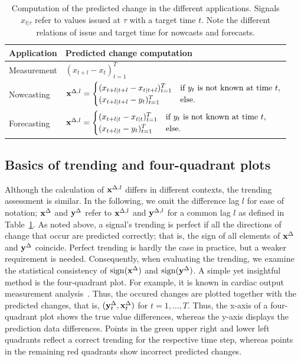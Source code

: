 \begin{table}
    \centering
    \begin{tabularx}{0.75\textwidth}{l X}
        \toprule
        Application & Predicted change computation \\
        \midrule
        Measurement & $(x_{t + l} - x_t)_{t=1}^T \label{eq:diffxl_measure} $\\
        Nowcasting & $
\mathbf{x}^{\Delta,l} =
\begin{cases}
(x_{t+l|t+l} -x_{t|t+l})^T_{t=1} & \text{if } y_{t} \text{ is not known at time } t, \\
(x_{t+l|t+l} -y_{t})^T_{t=1} & \text{else}.
\end{cases} \label{eq:diffxl_nowcasting}
$ \\
        Forecasting & $
\mathbf{x}^{\Delta,l} =
\begin{cases}
(x_{t+l|t} - x_{t|t})^T_{t=1} & \text{if } y_{t} \text{ is not known at time } t, \\
(x_{t+l|t} - y_{t})^T_{t=1}  & \text{else}.
\end{cases} \label{eq:diffxl_forecasting}
$\\
        \bottomrule
    \end{tabularx}
    \caption{Computation of the predicted change in the different applications. Signals $x_{t | \tau}$ refer to values issued at $\tau$ with a target time $t$. Note the different relations of issue and target time for nowcasts and forecasts. }
    \label{tab:notation}
\end{table}


\subsection{Basics of trending and four-quadrant plots}\label{subsec:trending-basics}

Although the calculation of $\mathbf{x}^{\Delta,l}$ differs in different contexts, the trending assessment is similar.
In the following, we omit the difference lag $l$ for ease of notation; $\mathbf{x}^{\Delta}$ and $\mathbf{y}^{\Delta}$ refer to $\mathbf{x}^{\Delta,l}$ and $\mathbf{y}^{\Delta,l}$ for a common lag $l$ as defined in Table~\ref{tab:notation}.
As noted above, a signal's trending is perfect if all the directions of change that occur are predicted correctly; that is, the sign of all elements of $\mathbf{x}^{\Delta}$ and $\mathbf{y}^{\Delta}$ coincide.
Perfect trending is hardly the case in practice, but a weaker requirement is needed.
Consequently, when evaluating the trending, we examine the statistical consistency of $\operatorname{sign}(\mathbf{x}^{\Delta})$ and $\operatorname{sign}(\mathbf{y}^{\Delta})$.
A simple yet insightful method is the four-quadrant plot.
For example, it is known in cardiac output measurement analysis~\parencite{Saugel2015,perrino1998intraoperative}. 
Thus, the occured changes are plotted together with the predicted changes, that is, $(\mathbf{y}^{\Delta}_t, \mathbf{x}^{\Delta}_t)$ for $t = 1, \dots, T$.
Thus, the x-axis of a four-quadrant plot shows the true value differences, whereas the y-axis displays the prediction data differences.
Points in the green upper right and lower left quadrants reflect a correct trending for the respective time step, whereas points in the remaining red quadrants show incorrect predicted changes.

